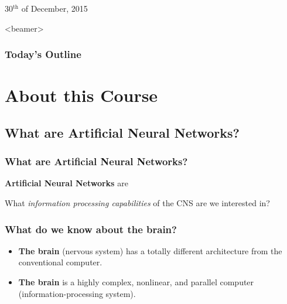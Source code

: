 

 {30$^{\text{th}}$ of December, 2015}



\begin{frame}[plain]
  \titlepage
\end{frame}

\begin{frame}<beamer>%
  \frametitle{Today's Outline}%
  \tableofcontents[,subsectionstyle=hide/hide/hide]%
\end{frame}%

\section{About this Course}
\label{sec:about}

\subsection{What are Artificial Neural Networks?}
\label{sec:what_are_ann}

\begin{frame}
  \frametitle{What are Artificial Neural Networks?}
  \begin{definition}
    \textbf{Artificial Neural Networks} are 
  \end{definition}
  \pause
  \vspace*{2em}
  What \emph{information processing capabilities} of the CNS are we
  interested in?
\end{frame}

\begin{frame}
  \frametitle{What do we know about the brain?}
  \begin{itemize}
  \item \textbf{The brain} (nervous system) has a totally
    different architecture from the conventional computer.
  \item \textbf{The brain} is a highly complex, nonlinear, and
    parallel computer (information-processing system). \cite[page
    1]{haykin2009neural}
  \end{itemize}
\end{frame}

